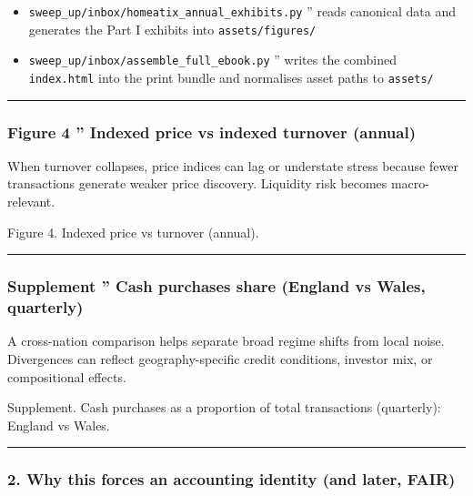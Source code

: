 \documentclass[
]{article}
\providecommand{\tightlist}{%
  \setlength{\itemsep}{0pt}\setlength{\parskip}{0pt}}
\begin{document}
\begin{itemize}
\tightlist
\item
  \texttt{sweep\_up/inbox/homeatix\_annual\_exhibits.py} '' reads
  canonical data and generates the Part I exhibits into
  \texttt{assets/figures/}
\item
  \texttt{sweep\_up/inbox/assemble\_full\_ebook.py} '' writes the
  combined \texttt{index.html} into the print bundle and normalises
  asset paths to \texttt{assets/}
\end{itemize}

\begin{center}\rule{0.5\linewidth}{0.5pt}\end{center}

\protect{}\label{part1-fig4}
\subsubsection{Figure 4 '' Indexed price vs indexed turnover
(annual)}\label{figure-4-indexed-price-vs-indexed-turnover-annual}

When turnover collapses, price indices can lag or understate stress
because fewer transactions generate weaker price discovery. Liquidity
risk becomes macro-relevant.

Figure 4. Indexed price vs turnover (annual).

\begin{center}\rule{0.5\linewidth}{0.5pt}\end{center}

\protect{}\label{part1-cashshare-ew}
\subsubsection{Supplement '' Cash purchases share (England vs Wales,
quarterly)}\label{supplement-cash-purchases-share-england-vs-wales-quarterly}

A cross-nation comparison helps separate broad regime shifts from local
noise. Divergences can reflect geography-specific credit conditions,
investor mix, or compositional effects.

Supplement. Cash purchases as a proportion of total transactions
(quarterly): England vs Wales.

\begin{center}\rule{0.5\linewidth}{0.5pt}\end{center}

\protect{}\label{part1-bridge-to-identity}
\subsubsection{2. Why this forces an accounting identity (and later,
FAIR)}\label{why-this-forces-an-accounting-identity-and-later-fair}
\end{document}
